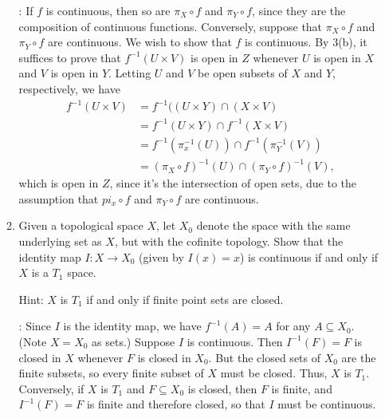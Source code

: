 \documentclass[12pt]{article}
\begin{document}
\begin{enumerate}
\begin{enumerate}
\bigskip

: If $f$ is continuous, then so are $\pi_X\circ f$ and $\pi_Y\circ f$, since they are the composition of continuous functions. Conversely, suppose that $\pi_X\circ f$ and $\pi_Y\circ f$ are continuous. We wish to show that $f$ is continuous. By 3(b), it suffices to prove that $f^{-1}(U\times V)$ is open in $Z$ whenever $U$ is open in $X$ and $V$ is open in $Y$. Letting $U$ and $V$ be open subsets of $X$ and $Y$, respectively, we have
\begin{align*}
 f^{-1}(U\times V) & = f^{-1}((U\times Y)\cap (X\times V)\\
& = f^{-1}(U\times Y)\cap f^{-1}(X\times V)\\
& = f^{-1}(\pi_x^{-1}(U))\cap f^{-1}(\pi_Y^{-1}(V))\\
& = (\pi_X\circ f)^{-1}(U)\cap (\pi_Y\circ f)^{-1}(V),
\end{align*}
which is open in $Z$, since it's the intersection of open sets, due to the assumption that $pi_x\circ f$ and $\pi_Y\circ f$ are continuous.


\bigskip

\item Given a topological space $X$, let $X_0$ denote the space with the same underlying set as $X$, but with the cofinite topology. Show that the identity map $I:X\to X_0$ (given by $I(x)=x$) is continuous if and only if $X$ is a $T_1$ space.

Hint: $X$ is $T_1$ if and only if finite point sets are closed.

\bigskip

: Since $I$ is the identity map, we have $f^{-1}(A) = A$ for any $A\subseteq X_0$. (Note $X=X_0$ as sets.) Suppose $I$ is continuous. Then $I^{-1}(F)=F$ is closed in $X$ whenever $F$ is closed in $X_0$. But the closed sets of $X_0$ are the finite subsets, so every finite subset of $X$ must be closed. Thus, $X$ is $T_1$. Conversely, if $X$ is $T_1$ and $F\subseteq X_0$ is closed, then $F$ is finite, and $I^{-1}(F)=F$ is finite and therefore closed, so that $I$ must be continuous.

\bigskip

\end{enumerate}
\end{enumerate}
\end{document}
